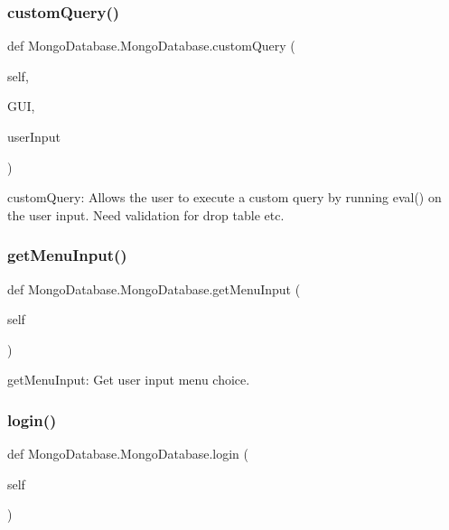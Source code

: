 \subsubsection{\texorpdfstring{custom\+Query()}{customQuery()}}
{\footnotesize\ttfamily def Mongo\+Database.\+Mongo\+Database.\+custom\+Query (\begin{DoxyParamCaption}\item[{}]{self,  }\item[{}]{G\+UI,  }\item[{}]{user\+Input }\end{DoxyParamCaption})}

\begin{DoxyVerb}customQuery: Allows the user to execute a custom query by running
    eval() on the user input. Need validation for drop table etc. \end{DoxyVerb}
 \hypertarget{class_mongo_database_1_1_mongo_database_ab5d6d51b956790d3804e4c566ae40cfe}{}\label{class_mongo_database_1_1_mongo_database_ab5d6d51b956790d3804e4c566ae40cfe} 
\subsubsection{\texorpdfstring{get\+Menu\+Input()}{getMenuInput()}}
{\footnotesize\ttfamily def Mongo\+Database.\+Mongo\+Database.\+get\+Menu\+Input (\begin{DoxyParamCaption}\item[{}]{self }\end{DoxyParamCaption})}

\begin{DoxyVerb}getMenuInput: Get user input menu choice. \end{DoxyVerb}
 \hypertarget{class_mongo_database_1_1_mongo_database_a54df0dccd3550bc038fa246ee0f97a15}{}\label{class_mongo_database_1_1_mongo_database_a54df0dccd3550bc038fa246ee0f97a15} 
\subsubsection{\texorpdfstring{login()}{login()}}
{\footnotesize\ttfamily def Mongo\+Database.\+Mongo\+Database.\+login (\begin{DoxyParamCaption}\item[{}]{self }\end{DoxyParamCaption})}

